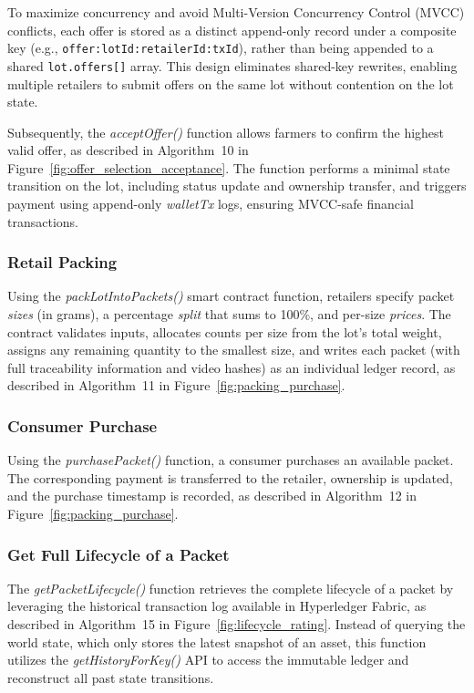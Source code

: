 \documentclass[12pt]{article}
\begin{document}
	To maximize concurrency and avoid Multi-Version Concurrency Control (MVCC) conflicts, each offer is stored as a distinct append-only record under a composite key (e.g., \texttt{offer:lotId:retailerId:txId}), rather than being appended to a shared \texttt{lot.offers[]} array. This design eliminates shared-key rewrites, enabling multiple retailers to submit offers on the same lot without contention on the lot state.
	
	Subsequently, the \textit{acceptOffer()} function allows farmers to confirm the highest valid offer, as described in Algorithm~10 in Figure~\ref{fig:offer_selection_acceptance}. The function performs a minimal state transition on the lot, including status update and ownership transfer, and triggers payment using append-only \textit{walletTx} logs, ensuring MVCC-safe financial transactions.
	

	\subsubsection{Retail Packing}
	
	
	Using the \textit{packLotIntoPackets()} smart contract function, retailers specify packet \emph{sizes} (in grams), a percentage \emph{split} that sums to 100\%, and per-size \emph{prices}. The contract validates inputs, allocates counts per size from the lot’s total weight, assigns any remaining quantity to the smallest size, and writes each packet (with full traceability information and video hashes) as an individual ledger record, as described in Algorithm~11 in Figure~\ref{fig:packing_purchase}.
	
	
	
	
	\subsubsection{Consumer Purchase}
	
	Using the \textit{purchasePacket()} function, a consumer purchases an available packet. The corresponding payment is transferred to the retailer, ownership is updated, and the purchase timestamp is recorded, as described in Algorithm~12 in Figure~\ref{fig:packing_purchase}.
	
	\subsubsection{Get Full Lifecycle of a Packet}
	
	The \textit{getPacketLifecycle()} function retrieves the complete lifecycle of a packet by leveraging the historical transaction log available in Hyperledger Fabric, as described in Algorithm~15 in Figure~\ref{fig:lifecycle_rating}. Instead of querying the world state, which only stores the latest snapshot of an asset, this function utilizes the \textit{getHistoryForKey()} API to access the immutable ledger and reconstruct all past state transitions.
	
\end{document}
